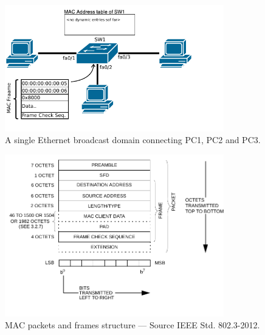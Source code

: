 \documentclass[pdftex,12pt,a4paper]{article}
\begin{document}
        \begin{figure}[tbh]
            \centering
            \includegraphics[width=0.85\textwidth]{figures/diag1.pdf}
            \caption{A single Ethernet broadcast domain connecting PC1, PC2 and PC3.}
            \label{fig:bd}
        \end{figure}

        \begin{figure}[tbh]
            \centering
            \includegraphics[width=0.85\textwidth]{figures/macpacket.pdf}
            \caption{MAC packets and frames structure --- Source IEEE Std. 802.3-2012.}
            \label{fig:macpacket}
        \end{figure}

        \newpage
\end{document}
